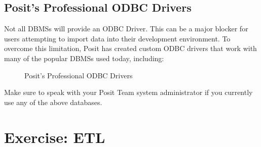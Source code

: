 \documentclass[
  letterpaper,
  DIV=11,
  numbers=noendperiod]{scrreprt}
\begin{document}
\section{Posit's Professional ODBC
Drivers}\label{posits-professional-odbc-drivers}

Not all DBMSs will provide an ODBC Driver. This can be a major blocker
for users attempting to import data into their development environment.
To overcome this limitation, Posit has created custom ODBC drivers that
work with many of the popular DBMSs used today, including:

\begin{figure}


\caption{\label{fig-posit-odbc-drivers}Posit's Professional ODBC
Drivers}

\end{figure}%

Make sure to speak with your Posit Team system administrator if you
currently use any of the above databases.

\chapter{Exercise: ETL}\label{exercise-etl}
\end{document}
